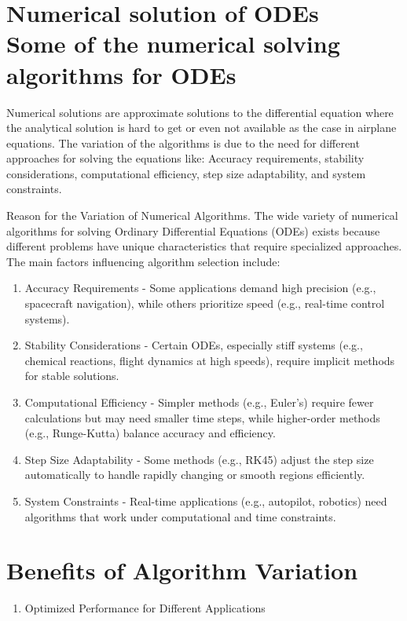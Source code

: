 \documentclass[10pt]{article}
\begin{document}
\section*{Numerical solution of ODEs \\
 Some of the numerical solving algorithms for ODEs}
Numerical solutions are approximate solutions to the differential equation where the analytical solution is hard to get or even not available as the case in airplane equations. The variation of the algorithms is due to the need for different approaches for solving the equations like: Accuracy requirements, stability considerations, computational efficiency, step size adaptability, and system constraints.

Reason for the Variation of Numerical Algorithms. The wide variety of numerical algorithms for solving Ordinary Differential Equations (ODEs) exists because different problems have unique characteristics that require specialized approaches. The main factors influencing algorithm selection include:

\begin{enumerate}
  \item Accuracy Requirements - Some applications demand high precision (e.g., spacecraft navigation), while others prioritize speed (e.g., real-time control systems).
  \item Stability Considerations - Certain ODEs, especially stiff systems (e.g., chemical reactions, flight dynamics at high speeds), require implicit methods for stable solutions.
  \item Computational Efficiency - Simpler methods (e.g., Euler's) require fewer calculations but may need smaller time steps, while higher-order methods (e.g., Runge-Kutta) balance accuracy and efficiency.
  \item Step Size Adaptability - Some methods (e.g., RK45) adjust the step size automatically to handle rapidly changing or smooth regions efficiently.
  \item System Constraints - Real-time applications (e.g., autopilot, robotics) need algorithms that work under computational and time constraints.
\end{enumerate}

\section*{Benefits of Algorithm Variation}
\begin{enumerate}
  \item Optimized Performance for Different Applications
\end{enumerate}
\end{document}
